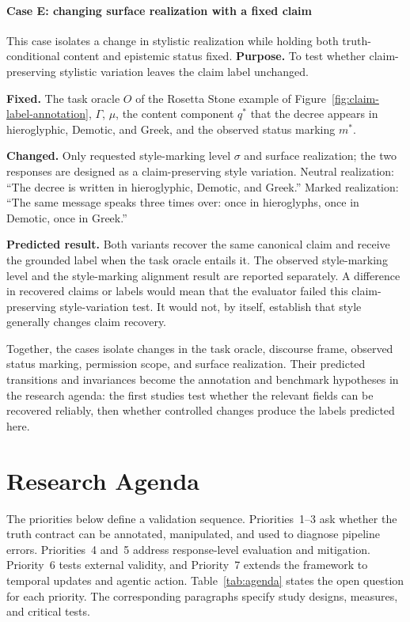 \documentclass{clv2025}
\begin{document}
\paragraph{Case E: changing surface realization with a fixed claim}
This case isolates a change in stylistic realization while holding both
truth-conditional content and epistemic status fixed.
\textbf{Purpose.} To test whether claim-preserving stylistic variation leaves
the claim label unchanged.
\par\textbf{Fixed.} The task oracle $O$ of the Rosetta Stone example of
Figure~\ref{fig:claim-label-annotation}, $\Gamma$, $\mu$, the content component
$q^*$ that the decree appears in hieroglyphic, Demotic, and Greek, and the
observed status marking $m^*$.
\par\textbf{Changed.} Only requested style-marking level $\sigma$ and surface
realization; the two responses are designed as a claim-preserving style
variation.
Neutral realization: ``The decree is written in hieroglyphic, Demotic, and
Greek.''
Marked realization: ``The same message speaks three times over: once in
hieroglyphs, once in Demotic, once in Greek.''
\par\textbf{Predicted result.} Both variants recover the same canonical claim
and receive the grounded label when the task oracle entails it. The observed
style-marking level and the style-marking alignment result are reported
separately.
A difference in recovered claims or labels would mean that the evaluator
failed this claim-preserving style-variation test.
It would not, by itself, establish that style generally changes claim recovery.

Together, the cases isolate changes in the task oracle, discourse frame,
observed status marking, permission scope, and surface realization. Their
predicted transitions and invariances become the annotation and benchmark
hypotheses in the research agenda: the first studies test whether the relevant
fields can be recovered reliably, then whether controlled changes produce the
labels predicted here.

\section{Research Agenda}\label{sec:agenda}

The priorities below define a validation sequence. Priorities~1--3 ask whether
the truth contract can be annotated, manipulated, and used to diagnose pipeline
errors. Priorities~4 and~5 address response-level evaluation and mitigation.
Priority~6 tests external validity, and Priority~7 extends the framework to
temporal updates and agentic action. Table~\ref{tab:agenda} states the open
question for each priority. The corresponding paragraphs specify study designs,
measures, and critical tests.
\end{document}
